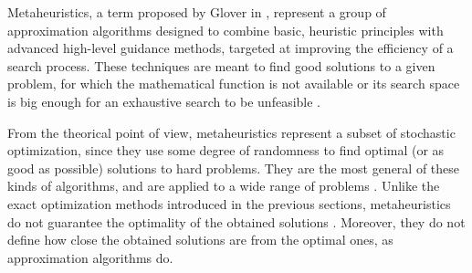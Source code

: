 Metaheuristics, a term proposed by Glover in \cite{Glover-Future_paths_for_integer_programming_and_links_to_artificial_intelligence:1986},
represent a group of approximation algorithms designed to combine
basic, heuristic principles with advanced high-level guidance methods,
targeted at improving the efficiency of a search process. These techniques
are meant to find good solutions to a given problem, for which the
mathematical function is not available or its search space is big
enough for an exhaustive search to be unfeasible \cite{Kochenberger_Handbook_of_metaheuristics:2003}.

From the theorical point of view, metaheuristics represent a subset
of stochastic optimization, since they use some degree of randomness
to find optimal (or as good as possible) solutions to hard problems.
They are the most general of these kinds of algorithms, and are applied
to a wide range of problems \cite{Luke-Essentials_of_metaheuristics:2009}.
Unlike the exact optimization methods introduced in the previous sections,
metaheuristics do not guarantee the optimality of the obtained solutions
\cite{Talbi_Metaheuristics:2009}. Moreover, they do not define how
close the obtained solutions are from the optimal ones, as approximation
algorithms do.

